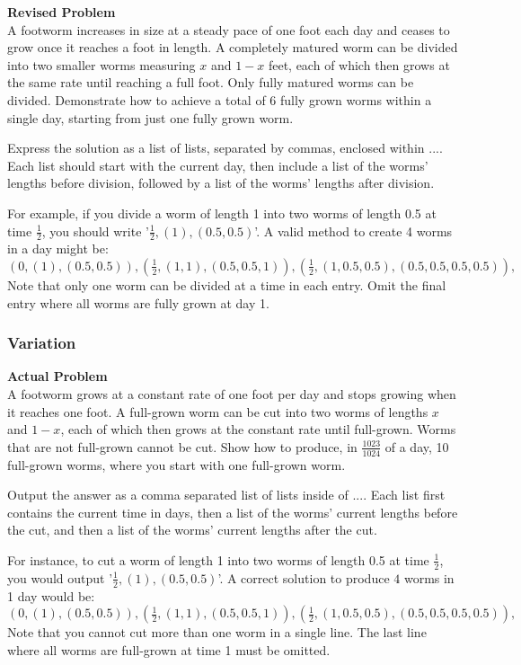 \textbf{Revised Problem}\\
A footworm increases in size at a steady pace of one foot each day and ceases to grow once it reaches a foot in length. A completely matured worm can be divided into two smaller worms measuring $x$ and $1-x$ feet, each of which then grows at the same rate until reaching a full foot. Only fully matured worms can be divided. Demonstrate how to achieve a total of 6 fully grown worms within a single day, starting from just one fully grown worm.

Express the solution as a list of lists, separated by commas, enclosed within $\boxed{...}$. Each list should start with the current day, then include a list of the worms' lengths before division, followed by a list of the worms' lengths after division.

For example, if you divide a worm of length 1 into two worms of length 0.5 at time $\frac{1}{2}$, you should write '$\frac{1}{2}, (1), (0.5, 0.5)$'. A valid method to create 4 worms in a day might be:
$\boxed{
    (0, (1), (0.5, 0.5)),
    (\frac{1}{2}, (1, 1), (0.5, 0.5, 1)),
    (\frac{1}{2}, (1, 0.5, 0.5), (0.5, 0.5, 0.5, 0.5)),
}$
Note that only one worm can be divided at a time in each entry. Omit the final entry where all worms are fully grown at day 1.

\subsubsection{Variation}
\textbf{Actual Problem}\\
A footworm grows at a constant rate of one foot per day and stops growing when it reaches one foot. A full-grown worm can be cut into two worms of lengths $x$ and $1-x$, each of which then grows at the constant rate until full-grown. Worms that are not full-grown cannot be cut. Show how to produce, in $\frac{1023}{1024}$ of a day, 10 full-grown worms, where you start with one full-grown worm.

Output the answer as a comma separated list of lists inside of $\boxed{...}$. Each list first contains the current time in days, then a list of the worms' current lengths before the cut, and then a list of the worms' current lengths after the cut.

For instance, to cut a worm of length 1 into two worms of length 0.5 at time $\frac{1}{2}$, you would output '$\frac{1}{2}, (1), (0.5, 0.5)$'. A correct solution to produce $4$ worms in 1 day would be:
$\boxed{
    (0, (1), (0.5, 0.5)),
    (\frac{1}{2}, (1, 1), (0.5, 0.5, 1)),
    (\frac{1}{2}, (1, 0.5, 0.5), (0.5, 0.5, 0.5, 0.5)),
}$
Note that you cannot cut more than one worm in a single line. The last line where all worms are full-grown at time 1 must be omitted.

